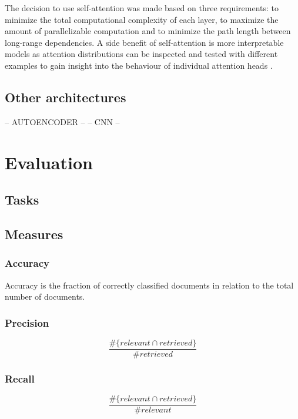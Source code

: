 The decision to use self-attention was made based on three requirements: to minimize the total computational complexity of each layer, to maximize the amount of parallelizable computation and to minimize the path length between long-range dependencies.
A side benefit of self-attention is more interpretable models as attention distributions can be inspected and tested with different examples to gain insight into the behaviour of individual attention heads \cite{vaswani2017}.

\subsection{Other architectures} \label{Other architectures}
-- AUTOENCODER --
-- CNN --

\section{Evaluation} \label{Evaluation}

\subsection{Tasks}\label{Tasks}

\subsection{Measures} \label{Measures}

\subsubsection{Accuracy} \label{Accuracy}
Accuracy is the fraction of correctly classified documents in relation to the total number of documents.

\subsubsection{Precision} \label{Precision}

\begin{equation}
  \dfrac{\#\{relevant \cap retrieved\}}{\#retrieved}
\end{equation}

\subsubsection{Recall} \label{Recall}

\begin{equation}
  \dfrac{\#\{relevant \cap retrieved\}}{\#relevant}
\end{equation}

